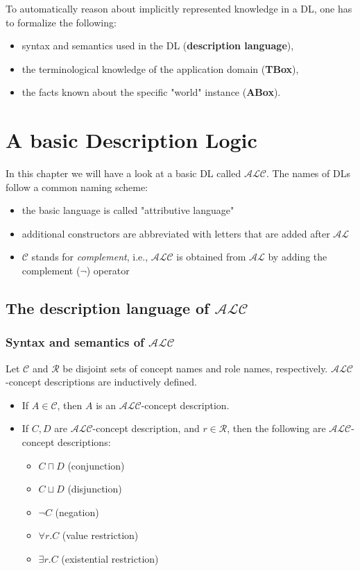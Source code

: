 To automatically reason about implicitly represented knowledge in a DL, one has to formalize the following:
\begin{itemize}
	\item syntax and semantics used in the DL (\textbf{description language}),
	\item the terminological knowledge of the application domain (\textbf{TBox}),
	\item the facts known about the specific "world" instance (\textbf{ABox}).
\end{itemize}

\chapter{A basic Description Logic}
In this chapter we will have a look at a basic DL called $\mathcal{ALC}$. 
The names of DLs follow a common naming scheme:
\begin{itemize}
	\item the basic language is called "attributive language"
	\item additional constructors are abbreviated with letters that are added after $ \mathcal{AL} $ 
	\item $ \mathcal{C} $ stands for \textit{complement}, i.e., $ \mathcal{ALC} $ is obtained from $ \mathcal{AL} $ by adding the complement ($ \neg $) operator
\end{itemize}

\section{The description language of $\mathcal{ALC}$}
\subsection{Syntax and semantics of $\mathcal{ALC}$}
\begin{definition}
	Let $\mathscr{C}$ and $\mathscr{R}$ be disjoint sets of concept names and role names, respectively.
	$\mathcal{ALC}$-concept descriptions are inductively defined.
	\begin{itemize}
		\item If $ A \in \mathscr{C} $, then $ A $ is an $ \mathcal{ALC}$-concept description.
		\item If $ C,D $ are $ \mathcal{ALC}$-concept description, and $ r \in \mathscr{R} $, then the following are $\mathcal{ALC}$-concept descriptions:
			\begin{itemize}
				\item $ C \sqcap D $ (conjunction)
				\item $ C \sqcup D $ (disjunction)
				\item $ \neg C $ (negation)
				\item $ \forall r.C $ (value restriction)
				\item $ \exists r.C $ (existential restriction)
			\end{itemize}
	\end{itemize}
\end{definition}

